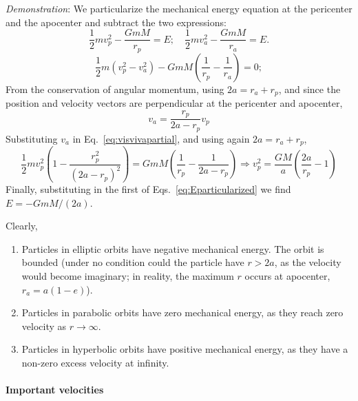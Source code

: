 \emph{Demonstration}: 
We particularize the mechanical energy equation at the pericenter and 
the apocenter and subtract the two expressions:
%
\begin{equation}
\frac{1}{2}mv_p^2 -\frac{GmM}{r_p} = E; \quad
\frac{1}{2}mv_a^2 -\frac{GmM}{r_a} = E.
\label{eq:Eparticularized}
\end{equation}
%
\begin{equation}
\frac{1}{2}m\left(v_p^2-v_a^2\right) -GmM\left(\frac{1}{r_p}
-\frac{1}{r_a}\right) = 0;
\label{eq:visvivapartial}
\end{equation}
%
From the conservation of angular momentum, using $2a=r_a+r_p$, 
and since the position and velocity 
vectors are perpendicular at the pericenter and apocenter,
%
\begin{equation}
v_a= \frac{r_p}{2a-r_p}v_p
\end{equation}
%
Substituting $v_a$ in Eq.~\eqref{eq:visvivapartial}, and using again
$2a=r_a+r_p$,
%
\begin{equation}
\frac{1}{2}mv_p^2\left(1-\frac{r_p^2}{(2a-r_p)^2}\right) =
GmM\left(\frac{1}{r_p} -\frac{1}{2a-r_p}\right)
\Rightarrow 
v^2_p=\frac{GM}{a}\left(\frac{2a}{r_p}-1\right) 
\end{equation}
%
Finally, substituting in the first of Eqs.~\eqref{eq:Eparticularized} we 
find $E = -GmM/(2a)$.

Clearly, 
%
\begin{enumerate}
\item Particles in elliptic orbits have negative mechanical energy. The orbit 
is bounded (under no condition could the particle have $r>2a$, as the velocity 
would become imaginary; in reality, the maximum $r$ occurs at apocenter, 
$r_a=a(1-e)$).
\item Particles in parabolic orbits have zero mechanical energy, as they reach 
zero velocity as $r\to \infty$.
\item Particles in hyperbolic orbits have positive mechanical energy, as they 
have a non-zero excess velocity at infinity.
\end{enumerate}

\paragraph{Important velocities}

